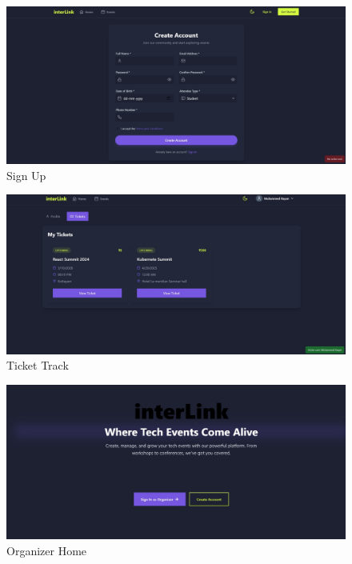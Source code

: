 \documentclass[twoside,a4paper,openright]{report} %
\begin{document}
\begin{flushleft}
	\begin{figure}[H]
		\centering
		\includegraphics[scale=0.35]{r4.jpg}    
		\caption{Sign Up} %
	\end{figure}
	
	\begin{figure}[H]
		\centering
		\includegraphics[scale=0.35]{r5.jpg}  
		\caption{Ticket Track} %
	\end{figure}
	
	\begin{figure}[H]
		\centering
		\includegraphics[scale=0.35]{r6.jpg}
		\caption{Organizer Home } %
	\end{figure}
	

\end{flushleft}
\end{document}
